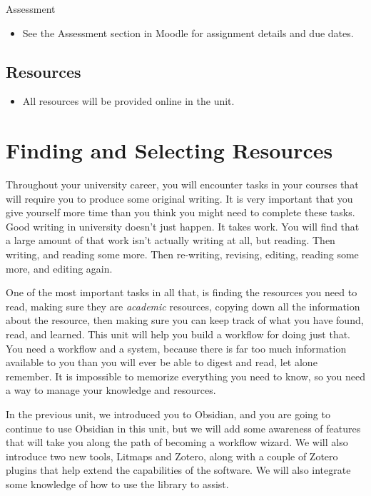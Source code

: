 \documentclass[
]{book}
\providecommand{\tightlist}{%
  \setlength{\itemsep}{0pt}\setlength{\parskip}{0pt}}
\theoremstyle{definition}
\theoremstyle{definition}
\theoremstyle{definition}
\theoremstyle{definition}
\theoremstyle{remark}
\begin{document}
\begin{assessment}
{Assessment}

\begin{itemize}
\tightlist
\item
  See the Assessment section in Moodle for assignment details and due dates.
\end{itemize}
\end{assessment}

\hypertarget{resources-1}{%
\subsection*{Resources}\label{resources-1}}

\begin{itemize}
\tightlist
\item
  All resources will be provided online in the unit.
\end{itemize}

\hypertarget{finding-and-selecting-resources}{%
\section{Finding and Selecting Resources}\label{finding-and-selecting-resources}}

Throughout your university career, you will encounter tasks in your courses that will require you to produce some original writing. It is very important that you give yourself more time than you think you might need to complete these tasks. Good writing in university doesn't just happen. It takes work. You will find that a large amount of that work isn't actually writing at all, but reading. Then writing, and reading some more. Then re-writing, revising, editing, reading some more, and editing again.

One of the most important tasks in all that, is finding the resources you need to read, making sure they are \emph{academic} resources, copying down all the information about the resource, then making sure you can keep track of what you have found, read, and learned. This unit will help you build a workflow for doing just that. You need a workflow and a system, because there is far too much information available to you than you will ever be able to digest and read, let alone remember. It is impossible to memorize everything you need to know, so you need a way to manage your knowledge and resources.

In the previous unit, we introduced you to Obsidian, and you are going to continue to use Obsidian in this unit, but we will add some awareness of features that will take you along the path of becoming a workflow wizard. We will also introduce two new tools, Litmaps and Zotero, along with a couple of Zotero plugins that help extend the capabilities of the software. We will also integrate some knowledge of how to use the library to assist.
\end{document}
